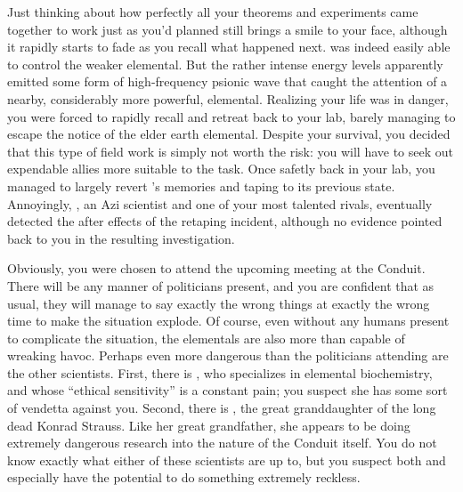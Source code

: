 \documentclass[char]{elementals}
\begin{document}
Just thinking about how perfectly all your theorems and experiments came together to work just as you'd planned  still brings a smile to your face, although it rapidly starts to fade as you recall what happened next. \cDiplomat{} was indeed easily able to control the weaker elemental. But the rather intense energy levels apparently emitted some form of high-frequency psionic wave that caught the attention of a nearby, considerably more powerful, elemental. Realizing your life was in danger, you were forced to rapidly recall \cDiplomat{} and retreat back to your lab, barely managing to escape the notice of the elder earth elemental. Despite your survival, you decided that this type of field work is simply not worth the risk: you will have to seek out expendable allies more suitable to the task. Once safetly back in your lab, you managed to largely revert \cDiplomat{}'s memories and taping to its previous state. Annoyingly, \cScientist{\intro}, an Azi scientist and one of your most talented rivals, eventually detected the after effects of the retaping incident, although no evidence pointed back to you in the resulting investigation.


Obviously, you were chosen to attend the upcoming meeting at the Conduit. There will be any manner of politicians present, and you are confident that as usual, they will manage to say exactly the wrong things at exactly the wrong time to make the situation explode. Of course, even without any humans present to complicate the situation, the elementals are also more than capable of wreaking havoc. Perhaps even more dangerous than the politicians attending are the other scientists. First, there is \cScientist{}, who specializes in elemental biochemistry, and whose ``ethical sensitivity'' is a constant pain; you suspect she has some sort of vendetta against you. Second, there is \cGD{\intro}, the great granddaughter of the long dead Konrad Strauss. Like her great grandfather, she appears to be doing extremely dangerous research into the nature of the Conduit itself. You do not know exactly what either of these scientists are up to, but you suspect both \cScientist{} and especially \cGD{} have the potential to do something extremely reckless.
\end{document}
